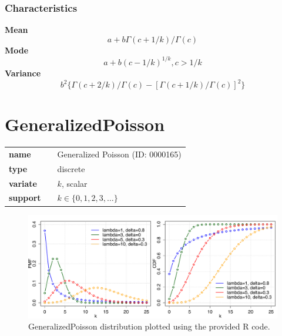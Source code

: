 \subsubsection*{Characteristics}
\smallskip \noindent \hspace{.2cm} \textbf{Mean} 
\begin{equation*}a + b\Gamma(c+1/k)/\Gamma(c)\end{equation*}
\smallskip \noindent \hspace{.2cm} \textbf{Mode} 
\begin{equation*}a+b(c-1/k)^{1/k}, c>1/k\end{equation*}
\smallskip \noindent \hspace{.2cm} \textbf{Variance} 
\begin{equation*}b^2\{\Gamma(c+2/k)/\Gamma(c)-[\Gamma(c+1/k)/\Gamma(c)]^2\}\end{equation*}
\smallskip
\section*{GeneralizedPoisson} 

  \bigskip 

\begin{tabular}{p{2cm}cl}
\textbf{name} & & Generalized Poisson (ID: 0000165)\\ 
 
\textbf{type} & & discrete \\ 

\textbf{variate} & & $k
$, scalar \\ 

\textbf{support} & & $k \in \{0,1,2,3,\dots\}$
\end{tabular}

\begin{figure}[ht!]
\centering
  \includegraphics[width=140mm]{pics/GeneralizedPoisson.pdf}
 \caption{GeneralizedPoisson distribution plotted using the provided R code.}
 \label{fig:GeneralizedPoisson}
\end{figure}

